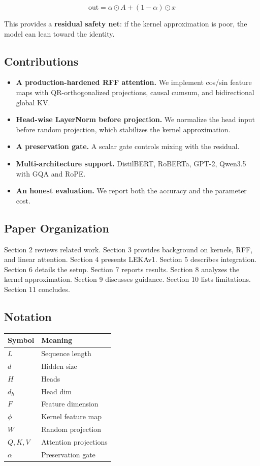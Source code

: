 \[
\text{out} = \alpha \odot A + (1 - \alpha) \odot x
\tag{1.8}
\]

This provides a \textbf{residual safety net}: if the kernel approximation is 
poor, the model can lean toward the identity.

\subsection{Contributions}

\begin{itemize}
\item \textbf{A production-hardened RFF attention.} We implement cos/sin feature
  maps with QR-orthogonalized projections, causal cumsum, and
  bidirectional global KV.
\item \textbf{Head-wise LayerNorm before projection.} We normalize the head input
  before random projection, which stabilizes the kernel approximation.
\item \textbf{A preservation gate.} A scalar gate controls mixing with the residual.
\item \textbf{Multi-architecture support.} DistilBERT, RoBERTa, GPT-2, Qwen3.5
  with GQA and RoPE.
\item \textbf{An honest evaluation.} We report both the accuracy and the parameter
  cost.

\end{itemize}
\subsection{Paper Organization}

Section 2 reviews related work. Section 3 provides background on kernels, 
RFF, and linear attention. Section 4 presents LEKAv1. Section 5 describes 
integration. Section 6 details the setup. Section 7 reports results. 
Section 8 analyzes the kernel approximation. Section 9 discusses guidance. 
Section 10 lists limitations. Section 11 concludes.



\subsection{Notation}

\begin{table}[H]
\centering
\small
\begin{tabular}{ll}
\toprule
\textbf{Symbol} & \textbf{Meaning} \\
\midrule
$L$ & Sequence length \\
$d$ & Hidden size \\
$H$ & Heads \\
$d_h$ & Head dim \\
$F$ & Feature dimension \\
$\phi$ & Kernel feature map \\
$W$ & Random projection \\
$Q, K, V$ & Attention projections \\
$\alpha$ & Preservation gate \\
\bottomrule
\end{tabular}
\end{table}

